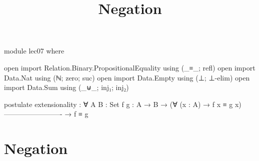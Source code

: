 \documentclass{lecturenotes}
\title{Negation}
\begin{document}
\maketitle

\begin{code}
module lec07 where

open import Relation.Binary.PropositionalEquality using (_≡_; refl)
open import Data.Nat using (ℕ; zero; suc)
open import Data.Empty using (⊥; ⊥-elim)
open import Data.Sum using (_⊎_; inj₁; inj₂)

postulate
  extensionality : ∀ {A B : Set} {f g : A → B}
    → (∀ (x : A) → f x ≡ g x)
    -------------------------
    → f ≡ g
\end{code}

\section{Negation}
\label{sec:neg}
\end{document}

